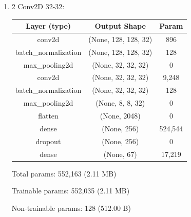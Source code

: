 \documentclass{article}
\begin{document}
\begin{enumerate}
        
        \item 2 Conv2D 32-32:
            \begin{table}[h!]
                \centering
                \begin{tabular}{| c | c | c |}
                    \hline
                    Layer (type) & Output Shape & Param \\
                    \hline
                    conv2d & (None, 128, 128, 32) & 896 \\
                    \hline
                    batch\_normalization & (None, 128, 128, 32) & 128 \\
                    \hline
                    max\_pooling2d & (None, 32, 32, 32) & 0 \\
                    \hline
                    conv2d & (None, 32, 32, 32) & 9,248 \\
                    \hline
                    batch\_normalization & (None, 32, 32, 32) & 128 \\
                    \hline
                    max\_pooling2d & (None, 8, 8, 32) & 0 \\
                    \hline
                    flatten & (None, 2048) & 0 \\
                    \hline
                    dense & (None, 256) & 524,544 \\
                    \hline
                    dropout & (None, 256) & 0 \\
                    \hline
                    dense & (None, 67) & 17,219 \\
                    \hline
                \end{tabular}
            \end{table}

            Total params: 552,163 (2.11 MB)

            Trainable params: 552,035 (2.11 MB)

            Non-trainable params: 128 (512.00 B)


\end{enumerate}
\end{document}
